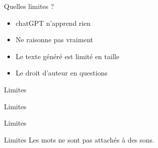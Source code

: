\begin{frame}{Quelles limites ?}
  \begin{itemize}
    \item chatGPT n'apprend rien 
    \item Ne raisonne pas vraiment
    \item Le texte généré est limité en taille
    \item Le droit d'auteur en questions
  \end{itemize} 
\end{frame}

\begin{frame}{Limites}
\end{frame}

\begin{frame}{Limites}
\end{frame}

\begin{frame}{Limites}
\end{frame}

\begin{frame}{Limites}
  Les mots ne sont pas attachés à des sons.
\end{frame}
